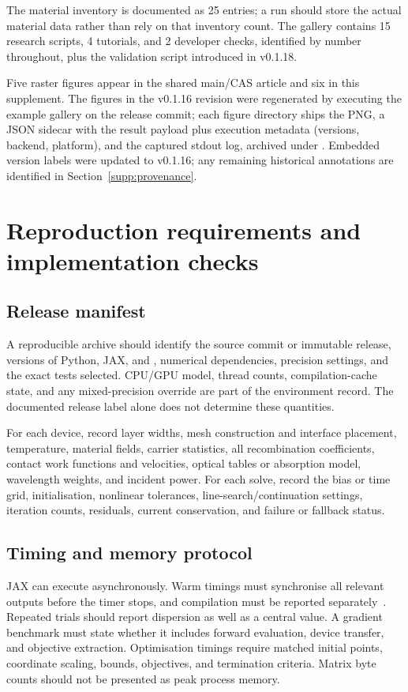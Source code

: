 \documentclass[11pt,a4paper]{article}
\numberwithin{equation}{section}
\begin{document}
The material inventory is documented as 25 entries; a run should store the
actual material data rather than rely on that inventory count.
The gallery contains 15 research scripts, 4 tutorials, and 2 developer
checks, identified by number throughout, plus the validation script
 introduced in v0.1.18.

Five raster figures appear in the shared main/CAS article and six in
this supplement. The figures in the v0.1.16 revision were regenerated
by executing the example gallery on the release commit; each figure
directory ships the PNG, a JSON sidecar with the result payload plus
execution metadata (versions, backend, platform), and the captured
stdout log, archived under . Embedded version
labels were updated to v0.1.16; any remaining historical annotations
are identified in Section~\ref{supp:provenance}.

\section{Reproduction requirements and implementation checks}\label{supp:reproduction}
\subsection{Release manifest}
A reproducible archive should identify the source commit or immutable
release, versions of Python, JAX, and , numerical dependencies,
precision settings, and the exact tests selected. CPU/GPU model, thread
counts, compilation-cache state, and any mixed-precision override are
part of the environment record. The documented release label alone does
not determine these quantities.

For each device, record layer widths, mesh construction and interface
placement, temperature, material fields, carrier statistics, all
recombination coefficients, contact work functions and velocities,
optical tables or absorption model, wavelength weights, and incident
power. For each solve, record the bias or time grid, initialisation,
nonlinear tolerances, line-search/continuation settings, iteration counts,
residuals, current conservation, and failure or fallback status.

\subsection{Timing and memory protocol}
JAX can execute asynchronously. Warm timings must synchronise all
relevant outputs before the timer stops, and compilation must be reported
separately~\cite{jaxbenchmark}. Repeated trials should report dispersion
as well as a central value. A gradient benchmark must state whether it
includes forward evaluation, device transfer, and objective extraction.
Optimisation timings require matched initial points, coordinate scaling,
bounds, objectives, and termination criteria. Matrix byte counts should
not be presented as peak process memory.
\end{document}
